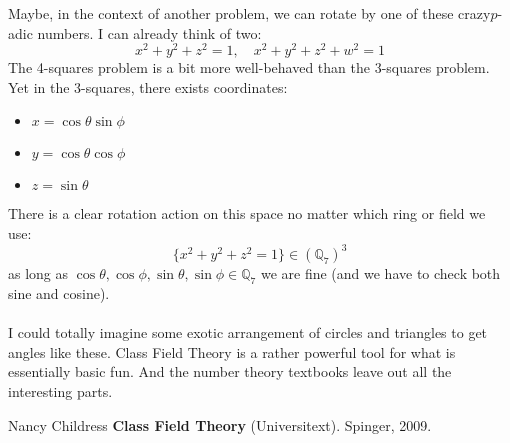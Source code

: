 \documentclass[12pt]{article}
\begin{document}
\newpage

\noindent Maybe, in the context of another problem, we can rotate by one of these crazy$p$-adic numbers.  I can already think of two:
$$ x^2 + y^2 + z^2 = 1, \quad x^2 + y^2 + z^2 + w^2 = 1$$
The 4-squares problem is a bit more well-behaved than the 3-squares problem.  Yet in the 3-squares, there exists coordinates:
\begin{itemize}
\item $ x = \cos \theta \sin \phi $
\item $ y = \cos \theta \cos \phi $
\item $ z = \sin \theta $
\end{itemize}
There is a clear rotation action on this space no matter which ring or field we use:
$$ \big\{ x^2 + y^2 + z^2  = 1 \big\}  \in (\mathbb{Q}_7)^3 $$
as long as $ \cos \theta, \cos \phi, \sin \theta, \sin \phi \in \mathbb{Q}_7$ we are fine (and we have to check both sine and cosine).   \\ \\
I could totally imagine some exotic arrangement of circles and triangles to get angles like these.  Class Field Theory is a rather powerful tool for what is essentially basic fun.  And the number theory textbooks leave out all the interesting parts.

\vfill

\begin{thebibliography}{}

\item Nancy Childress \textbf{Class Field Theory} (Universitext).  Spinger, 2009.

\end{thebibliography}
\end{document}
